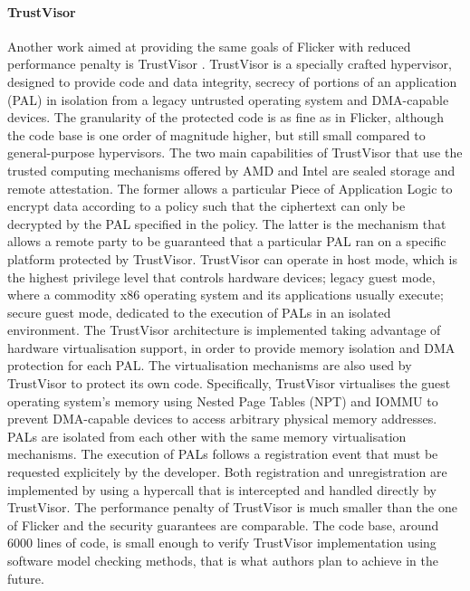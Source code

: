 \paragraph{TrustVisor}
Another work aimed at providing the same goals of Flicker with reduced performance penalty is TrustVisor \cite{TrustVisor}.
TrustVisor is a specially crafted hypervisor, designed to provide code and data integrity, secrecy of portions of an application (PAL) in isolation from a legacy untrusted operating system and DMA-capable devices.
The granularity of the protected code is as fine as in Flicker, although the code base is one order of magnitude higher, but still small compared to general-purpose hypervisors.
The two main capabilities of TrustVisor that use the trusted computing mechanisms offered by AMD and Intel are sealed storage and remote attestation. The former allows a particular Piece of Application Logic to encrypt data according to a policy such that the ciphertext can only be decrypted by the PAL specified in the policy. The latter is the mechanism that allows a remote party to be guaranteed that a particular PAL ran on a specific platform protected by TrustVisor.
TrustVisor can operate in host mode, which is the highest privilege level that controls hardware devices; legacy guest mode, where a commodity x86 operating system and its applications usually execute; secure guest mode, dedicated to the execution of PALs in an isolated environment.
The TrustVisor architecture is implemented taking advantage of hardware virtualisation support, in order to provide memory isolation and DMA protection for each PAL. The virtualisation mechanisms are also used by TrustVisor to protect its own code. Specifically, TrustVisor virtualises the guest operating system's memory using Nested Page Tables (NPT) and IOMMU to prevent DMA-capable devices to access arbitrary physical memory addresses.
PALs are isolated from each other with the same memory virtualisation mechanisms.
The execution of PALs follows a registration event that must be requested explicitely by the developer. Both registration and unregistration are implemented by using a hypercall that is intercepted and handled directly by TrustVisor.
The performance penalty of TrustVisor is much smaller than the one of Flicker and the security guarantees are comparable. The code base, around 6000 lines of code, is small enough to verify TrustVisor implementation using software model checking methods, that is what authors plan to achieve in the future.



